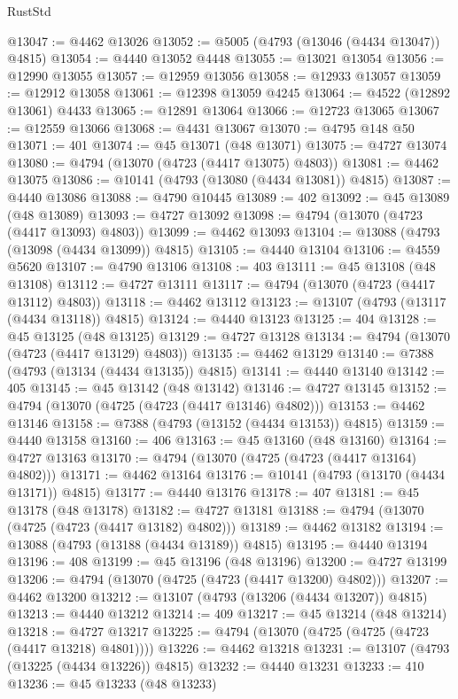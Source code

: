 \begin{lexlean}{RustStd}
\begin{coremodule}
{\begin{coremodule}
{{{{{{{{{{{{{{{{{{{{{{{{{{{{{{{{{{{{{{{{{{{{{{{{{{{{{{{{{{{{@13047 := @4462 @13026
@13052 := @5005 (@4793 (@13046 (@4434 @13047)) @4815)
@13054 := @4440 @13052 @4448
@13055 := @13021 @13054
@13056 := @12990 @13055
@13057 := @12959 @13056
@13058 := @12933 @13057
@13059 := @12912 @13058
@13061 := @12398 @13059 @4245
@13064 := @4522 (@12892 @13061) @4433
@13065 := @12891 @13064
@13066 := @12723 @13065
@13067 := @12559 @13066
@13068 := @4431 @13067
@13070 := @4795 @148 @50
@13071 := 401
@13074 := @45 @13071 (@48 @13071)
@13075 := @4727 @13074
@13080 := @4794 (@13070 (@4723 (@4417 @13075) @4803))
@13081 := @4462 @13075
@13086 := @10141 (@4793 (@13080 (@4434 @13081)) @4815)
@13087 := @4440 @13086
@13088 := @4790 @10445
@13089 := 402
@13092 := @45 @13089 (@48 @13089)
@13093 := @4727 @13092
@13098 := @4794 (@13070 (@4723 (@4417 @13093) @4803))
@13099 := @4462 @13093
@13104 := @13088 (@4793 (@13098 (@4434 @13099)) @4815)
@13105 := @4440 @13104
@13106 := @4559 @5620
@13107 := @4790 @13106
@13108 := 403
@13111 := @45 @13108 (@48 @13108)
@13112 := @4727 @13111
@13117 := @4794 (@13070 (@4723 (@4417 @13112) @4803))
@13118 := @4462 @13112
@13123 := @13107 (@4793 (@13117 (@4434 @13118)) @4815)
@13124 := @4440 @13123
@13125 := 404
@13128 := @45 @13125 (@48 @13125)
@13129 := @4727 @13128
@13134 := @4794 (@13070 (@4723 (@4417 @13129) @4803))
@13135 := @4462 @13129
@13140 := @7388 (@4793 (@13134 (@4434 @13135)) @4815)
@13141 := @4440 @13140
@13142 := 405
@13145 := @45 @13142 (@48 @13142)
@13146 := @4727 @13145
@13152 := @4794 (@13070 (@4725 (@4723 (@4417 @13146) @4802)))
@13153 := @4462 @13146
@13158 := @7388 (@4793 (@13152 (@4434 @13153)) @4815)
@13159 := @4440 @13158
@13160 := 406
@13163 := @45 @13160 (@48 @13160)
@13164 := @4727 @13163
@13170 := @4794 (@13070 (@4725 (@4723 (@4417 @13164) @4802)))
@13171 := @4462 @13164
@13176 := @10141 (@4793 (@13170 (@4434 @13171)) @4815)
@13177 := @4440 @13176
@13178 := 407
@13181 := @45 @13178 (@48 @13178)
@13182 := @4727 @13181
@13188 := @4794 (@13070 (@4725 (@4723 (@4417 @13182) @4802)))
@13189 := @4462 @13182
@13194 := @13088 (@4793 (@13188 (@4434 @13189)) @4815)
@13195 := @4440 @13194
@13196 := 408
@13199 := @45 @13196 (@48 @13196)
@13200 := @4727 @13199
@13206 := @4794 (@13070 (@4725 (@4723 (@4417 @13200) @4802)))
@13207 := @4462 @13200
@13212 := @13107 (@4793 (@13206 (@4434 @13207)) @4815)
@13213 := @4440 @13212
@13214 := 409
@13217 := @45 @13214 (@48 @13214)
@13218 := @4727 @13217
@13225 := @4794 (@13070 (@4725 (@4725 (@4723 (@4417 @13218) @4801))))
@13226 := @4462 @13218
@13231 := @13107 (@4793 (@13225 (@4434 @13226)) @4815)
@13232 := @4440 @13231
@13233 := 410
@13236 := @45 @13233 (@48 @13233)
}}}}}}}}}}}}}}}}}}}}}}}}}}}}}}}}}}}}}}}}}}}}}}}}}}}}}}}}}}}}
\end{coremodule}}
\end{coremodule}
\end{lexlean}

